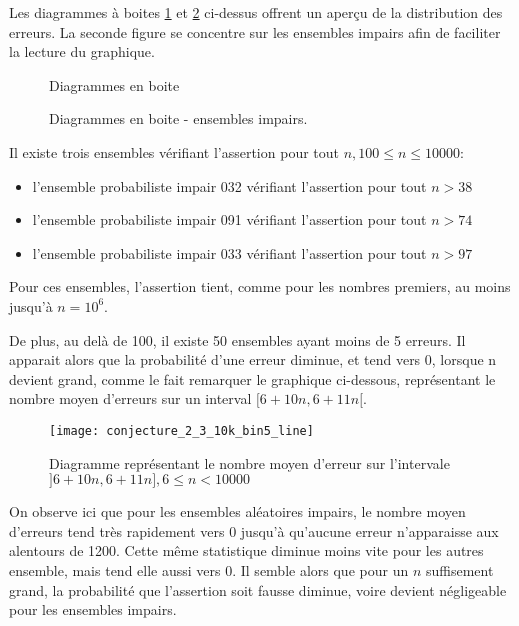 \documentclass[../main.text]{report}
\begin{document}
Les diagrammes à boites \ref{fig:boxplots} et \ref{fig:boxplots_Odd} ci-dessus offrent un aperçu de la distribution des erreurs. La seconde figure se concentre sur les ensembles impairs afin de faciliter la lecture du graphique.

\begin{figure}[H]
\centering
	\caption{Diagrammes en boite}
	\label{fig:boxplots}
\end{figure}

\begin{figure}[H]
\centering
	\caption{Diagrammes en boite - ensembles impairs.}
	\label{fig:boxplots_Odd}
\end{figure}

Il existe trois ensembles vérifiant l'assertion pour tout $n, 100 \leq n \leq 10000$:
\begin{itemize}
	\item l'ensemble probabiliste impair 032 vérifiant l'assertion pour tout $n > 38$
	\item l'ensemble probabiliste impair 091 vérifiant l'assertion pour tout $n > 74$
	\item l'ensemble probabiliste impair 033 vérifiant l'assertion pour tout $n > 97$
\end{itemize}
Pour ces ensembles, l'assertion tient, comme pour les nombres premiers, au moins jusqu'à $n=10^6$.  

De plus, au delà de 100, il existe 50 ensembles ayant moins de 5 erreurs. 
Il apparait alors que la probabilité d'une erreur diminue, et tend vers 0, lorsque n devient grand, comme le fait remarquer le graphique ci-dessous, représentant le nombre moyen d'erreurs sur un interval $[6+10n, 6+11n[$.
\begin{figure}[H]
\centering
\texttt{[image: conjecture\_2\_3\_10k\_bin5\_line]}
\caption{Diagramme représentant le nombre moyen d'erreur sur l'intervale $]6+10n, 6+11n], 6 \leq n < 10000$}
\label{fig:conjecture_2_3_10k_bin5_line}
\end{figure}

On observe ici que pour les ensembles aléatoires impairs, le nombre moyen d'erreurs tend très rapidement vers 0 jusqu'à qu'aucune erreur n'apparaisse aux alentours de 1200. Cette même statistique diminue moins vite pour les autres ensemble, mais tend elle aussi vers 0.
Il semble alors que pour un $n$ suffisement grand, la probabilité que l'assertion soit fausse diminue, voire devient négligeable pour les ensembles impairs. 
\end{document}
